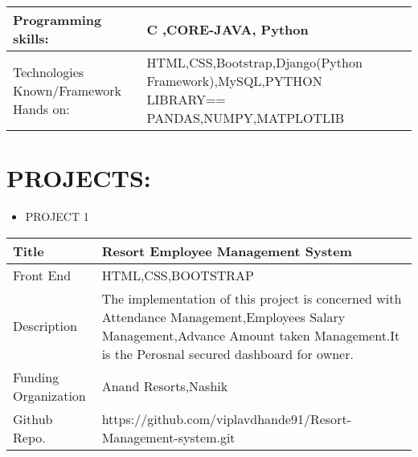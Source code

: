 \documentclass[a4paper,10pt]{article}
\begin{document}
\begin{tabu} to 0.8\textwidth { | X[l] | X[l] |  }
 \hline
 \large  Programming skills:  & C ,CORE-JAVA, Python\\
 
 \hline
\large  Technologies Known/Framework Hands on:  &   HTML,CSS,Bootstrap,Django(Python Framework),MySQL,PYTHON LIBRARY== PANDAS,NUMPY,MATPLOTLIB  \\
  


\hline
\end{tabu}






\section{PROJECTS:}

\renewcommand{\labelitemi}{$\blacksquare$}
 
 
 \begin{itemize}
   \item {\large PROJECT 1}
   
 \end{itemize}


\begin{tabu} to 0.9\textwidth { | X[l] | X[2.5] | }
 \hline
 \large Title & Resort Employee Management System\\
 
 \hline
\large Front End  & HTML,CSS,BOOTSTRAP\\
 
\hline
\large Description & The implementation of this project is concerned with Attendance Management,Employees Salary Management,Advance Amount taken Management.It is the Perosnal secured dashboard for owner. \\
\hline
\hline
\large Funding Organization & Anand Resorts,Nashik \\
\hline

\large Github Repo. & https://github.com/viplavdhande91/Resort-Management-system.git \\
 

 
\hline
\end{tabu}
 
\end{document}

